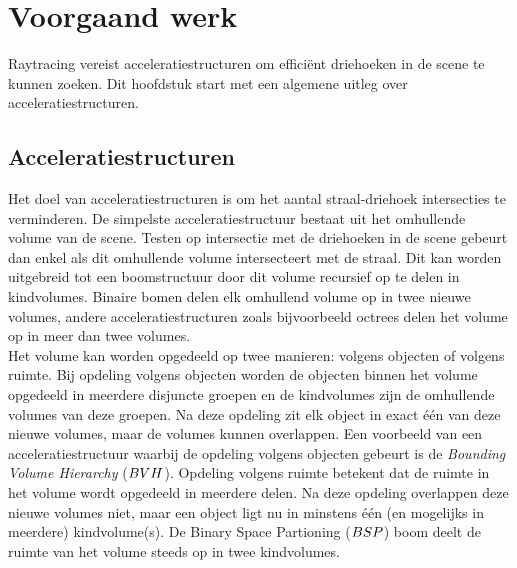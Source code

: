 \chapter{Voorgaand werk}
\label{hoofdstuk:voorgaand-werk}
Raytracing vereist acceleratiestructuren om efficiënt driehoeken in de scene te kunnen zoeken.
Dit hoofdstuk start met een algemene uitleg over acceleratiestructuren.

\section{Acceleratiestructuren}
    Het doel van acceleratiestructuren is om het aantal straal-driehoek intersecties te verminderen.
    De simpelste acceleratiestructuur bestaat uit het omhullende volume van de scene.
    Testen op intersectie met de driehoeken in de scene gebeurt dan enkel als dit omhullende volume intersecteert met de straal.
    Dit kan worden uitgebreid tot een boomstructuur door dit volume recursief op te delen in kindvolumes.
    Binaire bomen delen elk omhullend volume op in twee nieuwe volumes, andere acceleratiestructuren zoals bijvoorbeeld octrees delen het volume op in meer dan twee volumes.
    \\

    Het volume kan worden opgedeeld op twee manieren: volgens objecten of volgens ruimte.
    Bij opdeling volgens objecten worden de objecten binnen het volume opgedeeld in meerdere disjuncte groepen en de kindvolumes zijn de omhullende volumes van deze groepen.
    Na deze opdeling zit elk object in exact één van deze nieuwe volumes, maar de volumes kunnen overlappen.
    Een voorbeeld van een acceleratiestructuur waarbij de opdeling volgens objecten gebeurt is de \textit{Bounding Volume Hierarchy} ($BVH$).
    Opdeling volgens ruimte betekent dat de ruimte in het volume wordt opgedeeld in meerdere delen.
    Na deze opdeling overlappen deze nieuwe volumes niet, maar een object ligt nu in minstens één (en mogelijks in meerdere) kindvolume(s).
    De Binary Space Partioning ($BSP$) boom deelt de ruimte van het volume steeds op in twee kindvolumes.

